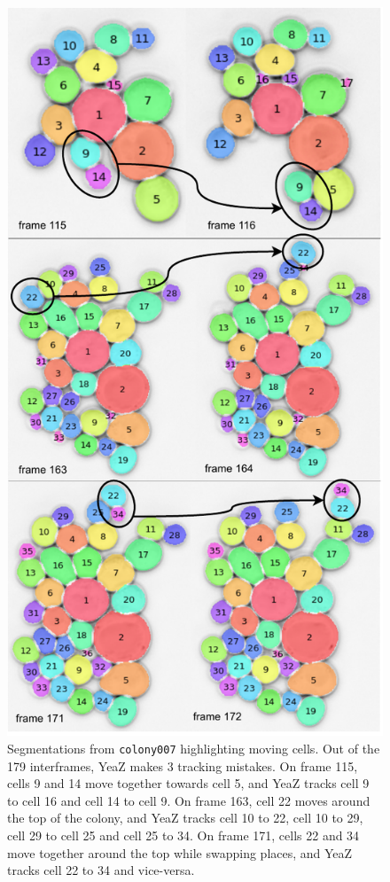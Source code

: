 \documentclass[10pt,conference,compsocconf,a4paper]{IEEEtran}
\begin{document}
	\begin{figure}[h!]
		\centering
		\includegraphics[width=\linewidth]{figures/mistracks.pdf}
		\caption{Segmentations from \texttt{colony007} highlighting moving cells. Out of the 179 interframes, YeaZ makes 3 tracking mistakes. On frame 115, cells 9 and 14 move together towards cell 5, and YeaZ tracks cell 9 to cell 16 and cell 14 to cell 9. On frame 163, cell 22 moves around the top of the colony, and YeaZ tracks cell 10 to 22, cell 10 to 29, cell 29 to cell 25 and cell 25 to 34. On frame 171, cells 22 and 34 move together around the top while swapping places, and YeaZ tracks cell 22 to 34 and vice-versa.}
		\label{fig:mistracks}
	\end{figure}
\end{document}
